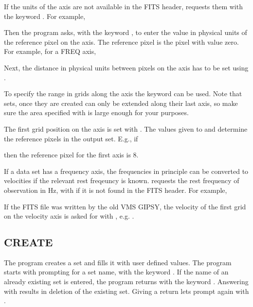 If the units of the axis are not available in the FITS header,
 requests them with the keyword .  For
example,


Then the program asks, with the keyword , to enter the
value in physical units of the reference pixel on the axis.  The
reference pixel is the pixel with value zero.  For example, for a FREQ
axis,


Next, the distance in physical units between pixels on the axis has to
be set using . 

To specify the range in grids along the axis the keyword 
can be used.  Note that sets, once they are created can only be extended
along their last axis, so make sure the area specified with
 is large enough for your purposes.

The first grid position on the axis is set with .  The
values given to  and  determine the
reference pixels in the output set.  E.g., if
  

then the reference pixel for the first axis is 8.

If a data set has a frequency axis, the frequencies in principle can be
converted to velocities if the relevant rest freqeuncy is known. 
 requests the rest frequency of observation in Hz, with
 if it is not found in the FITS header.  For example,


If the FITS file was written by the old VMS GIPSY, the velocity of the
first grid on the velocity axis is asked for with , e.g.
.

\subsection*{CREATE}

The program  creates a set and fills it with user
defined values.  The program starts with prompting for a set name, with
the keyword .  If the name of an already existing set is
entered, the program returns with the keyword . 
Answering with  results in deletion of the existing set. 
Giving a return lets  prompt again with
. 

